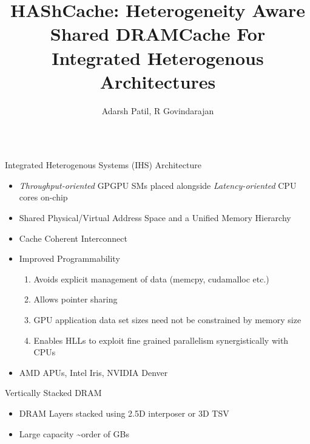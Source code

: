 \documentclass[final,t]{beamer}
\title{\LARGE HAShCache: Heterogeneity Aware Shared DRAMCache For Integrated Heterogenous Architectures}
\author{Adarsh Patil, R Govindarajan}
\institute{Department of CSA, Indian Institute of Science, Bangalore }
\begin{document}


\begin{frame}[t,fragile]{}
\vspace{-1em}
\begin{columns}[t]

\small

\begin{column}{.47\linewidth}

    \begin{exampleblock}{Integrated Heterogenous Systems (IHS) Architecture}
    \vspace{-0.2em}
    \begin{itemize}
    	\item \textit{Throughput-oriented} GPGPU SMs placed alongside \textit{Latency-oriented} CPU cores on-chip
   		\item Shared Physical/Virtual Address Space and a Unified Memory Hierarchy 
		\item Cache Coherent Interconnect
    	\item Improved Programmability
    	\begin{enumerate}[i]
	    	\item Avoids explicit management of data (memcpy, cudamalloc etc.)
	    	\item Allows pointer sharing
	    	\item GPU application data set sizes need not be constrained by memory size
	    	\item Enables HLLs to exploit fine grained parallelism synergistically with CPUs
    	\end{enumerate}
		\item AMD APUs, Intel Iris, NVIDIA Denver
    \end{itemize}
    \end{exampleblock}
    \begin{exampleblock}{Vertically Stacked DRAM}
    \vspace{-0.2em}
    \begin{itemize}
        	\item DRAM Layers stacked using 2.5D interposer or 3D TSV
       		\item Large capacity \textasciitilde order of GBs \\

\end{itemize}
\end{exampleblock}
\end{column}
\end{columns}
\end{frame}
\end{document}
